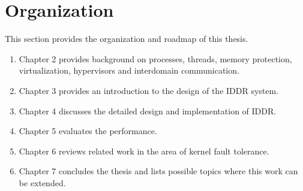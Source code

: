 \section {Organization}
This section provides the organization and roadmap of this thesis.

\begin{enumerate}
\item Chapter 2 provides background on processes, threads, memory protection, virtualization, hypervisors 
    and interdomain communication.
\item Chapter 3 provides an introduction to the design of the IDDR system.
\item Chapter 4 discusses the detailed design and implementation of IDDR. 
\item Chapter 5 evaluates the performance.
\item Chapter 6 reviews related work in the area of kernel fault tolerance.
\item Chapter 7 concludes the thesis and lists possible topics where this work can be extended.
\end{enumerate}

\pagebreak

